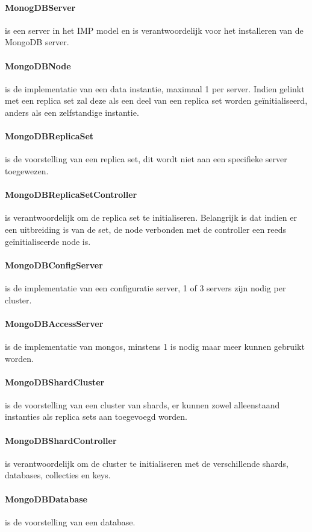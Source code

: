 	\paragraph{MonogDBServer} is een server in het IMP model en is verantwoordelijk voor het installeren van de MongoDB server. 
	\paragraph{MongoDBNode} is de implementatie van een data instantie, maximaal 1 per server. Indien gelinkt met een replica set zal deze als een deel van een replica set worden geïnitialiseerd, anders als een zelfstandige instantie. 
	\paragraph{MongoDBReplicaSet} is de voorstelling van een replica set, dit wordt niet aan een specifieke server toegewezen. 
	\paragraph{MongoDBReplicaSetController} is verantwoordelijk om de replica set te initialiseren. Belangrijk is dat indien er een uitbreiding is van de set, de node verbonden met de controller een reeds geïnitialiseerde node is.  
	\paragraph{MongoDBConfigServer} is de implementatie van een configuratie server, 1 of 3 servers zijn nodig per cluster. 
	\paragraph{MongoDBAccessServer} is de implementatie van mongos, minstens 1 is nodig maar meer kunnen gebruikt worden.
	\paragraph{MongoDBShardCluster} is de voorstelling van een cluster van shards, er kunnen zowel alleenstaand instanties als replica sets aan toegevoegd worden. 
	\paragraph{MongoDBShardController} is verantwoordelijk om de cluster te initialiseren met de verschillende shards, databases, collecties en keys. 
	\paragraph{MongoDBDatabase} is de voorstelling van een database.
